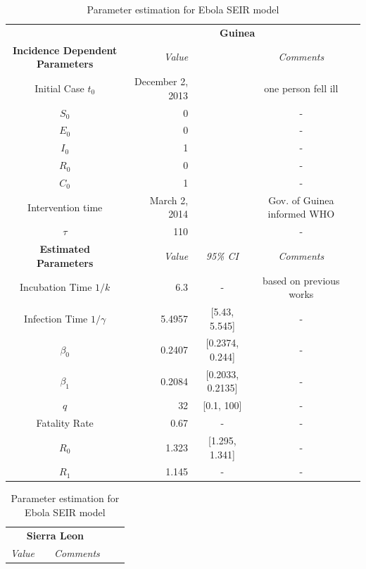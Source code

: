 \documentclass[10pt, journal,onecolumn]{IEEEtran}
\newcommand{\ra}[1]{\renewcommand{\arraystretch}{#1}}
\begin{document}



\begin{appendix}


\begin{table}[h]
\label{Table:parameter}
\caption{Parameter estimation for Ebola SEIR model} 
\centering
\tiny
\parbox{.55\linewidth}{\centering
\ra{1.3}
\begin{tabular}{@{}crccc@{}}%
& \multicolumn{3}{c}{\textbf{Guinea}} &  \\
\cmidrule{2-4}
\textbf{Incidence Dependent Parameters} & \textit{Value} && \textit{Comments} \\
\midrule
Initial Case $t_0$ & December 2, 2013 &  & one person fell ill\\
$S_0$ & 0& & -\\
$E_0$ & 0& & -\\
$I_0$ & 1& & -\\
$R_0$ & 0& & -\\
$C_0$ & 1& &-\\
Intervention time & March 2, 2014 &  & Gov. of Guinea informed WHO\\
$\tau$ &110 & & -\\
\cmidrule{2-4}
\textbf{Estimated Parameters} & \textit{Value} & \textit{95\% CI} & \textit{Comments} \\
\midrule
Incubation Time $1/k$ &6.3 & - & based on previous works \cite{}\\
Infection Time $1/\gamma$ &5.4957 & [5.43, 5.545] & -\\
$\beta_0$ &0.2407 & [0.2374, 0.244] & -\\
$\beta_1$ &0.2084 & [0.2033, 0.2135] & -\\
$q$ &32 & [0.1, 100] & -\\
Fatality Rate &0.67 & - & -\\
$R_0$ &1.323 &[1.295, 1.341] &-\\
$R_1$ &1.145 & - &-\\
\end{tabular}
}
\parbox{.3\linewidth}{
\centering
\ra{1.3}
\begin{tabular}{@{}crccc@{}}%
\multicolumn{3}{c}{\textbf{Sierra Leon}} &  \\
\cmidrule{1-3}
\textit{Value} && \textit{Comments} \\

\end{tabular}}
\end{table}
\end{appendix}
\end{document}
